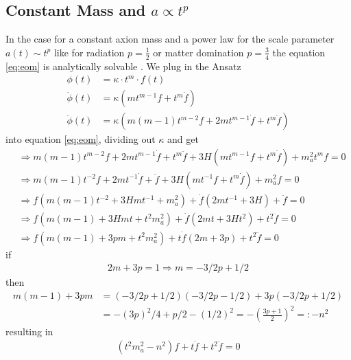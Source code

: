 \documentclass[a4paper]{article}
\begin{document}
\subsection{Constant Mass and $a \propto t^p$}
In the case for a constant axion mass and
a power law for the scale parameter $a(t) \sim t^p$ like for radiation $p = \frac{1}{2}$
or matter domination $p = \frac{3}{4}$
the equation \ref{eq:eom} is analytically solvable \cite[Chap. 4.2, Page 25]{MarshAxionCosmo}.
We plug in the Ansatz
\begin{align*}
    \phi(t) &= \kappa \cdot t^m \cdot f(t) \\
    \dot{\phi}(t) &= \kappa \left( m t^{m - 1} f + t^m \dot{f} \right) \\
    \ddot{\phi}(t) &= \kappa \left( m (m - 1) t^{m - 2} f + 2 m t^{m - 1} \dot{f} + t^m \ddot{f} \right)
\end{align*}
into equation \ref{eq:eom}, dividing out $\kappa$ and get
\begin{align*}
    &\Rightarrow m (m - 1) t^{m - 2} f + 2 m t^{m - 1} \dot{f} + t^m \ddot{f} + 3H \left( m t^{m - 1} f + t^m \dot{f} \right) + m_a^2 t^m f = 0 \\
    &\Rightarrow m (m - 1) t^{- 2} f + 2 m t^{- 1} \dot{f} + \ddot{f} + 3H \left( m t^{- 1} f + t^m \dot{f} \right) + m_a^2 f = 0 \\
    &\Rightarrow f \left( m (m - 1) t^{-2} + 3H m t^{-1} + m_a^2 \right) + \dot{f} \left( 2mt^{-1} + 3 H \right) + \ddot{f} = 0 \\
    &\Rightarrow f \left( m (m - 1) + 3H m t + t^2 m_a^2 \right) + \dot{f} \left( 2mt + 3 H t^2 \right) + t^2 \ddot{f} = 0 \\
    &\Rightarrow f \left( m (m - 1) + 3pm + t^2 m_a^2 \right) + t \dot{f} \left( 2m + 3 p \right) + t^2 \ddot{f} = 0
\end{align*}
if
\begin{align*}
    2m + 3p = 1 \Rightarrow m = - 3 / 2 p + 1 / 2
\end{align*}
then
\begin{align*}
    m (m - 1) + 3pm &= (-3/2p + 1/2) (-3/2p - 1/2) + 3p(-3/2p + 1/2) \\
                    &= - (3p)^2 / 4 + p/2 - (1/2)^2 = - (\frac{3p + 1}{2})^2 =: -n^2
\end{align*}
resulting in
\begin{align*}
    (t^2 m_a^2 - n^2) f + t \dot{f} + t^2 \ddot{f} = 0
\end{align*}
\end{document}
